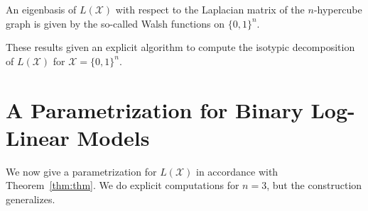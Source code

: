 \documentclass[cclicense]{hmcthesis}
\providecommand*{\xs}{\mathcal X}
\numberwithin{equation}{chapter}
\numberwithin{thmcounter}{chapter}
\begin{document}
    \begin{corollary}
        An eigenbasis of $L(\xs)$ with respect to the Laplacian matrix of the
        $n$-hypercube graph is given by the so-called Walsh functions on $\{0,
        1\}^n$.
        \label{cor:walsh}
    \end{corollary}

    These results given an explicit algorithm to compute the isotypic
    decomposition of $L(\xs)$ for $\xs = \{0, 1\}^n$.

\section{A Parametrization for Binary Log-Linear Models}
    
    We now give a parametrization for $L(\xs)$ in accordance with
    Theorem~\ref{thm:thm}.  We do explicit computations for $n=3$, but the
    construction generalizes.  
    
\end{document}

